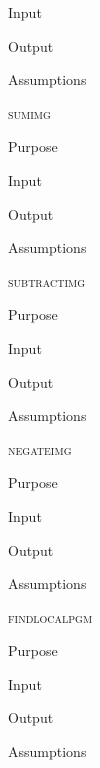 \documentclass[pdftex, 11pt]{article}
\begin{document}
\begin{description}
\begin{description}
			\item{Input}


			\item{Output}


			\item{Assumptions}


		\end{description}



	\item{\textsc{sumimg}}
		\begin{description}
			\item{Purpose}


			\item{Input}


			\item{Output}


			\item{Assumptions}


		\end{description}



	\item{\textsc{subtractimg}}
		\begin{description}
			\item{Purpose}


			\item{Input}


			\item{Output}


			\item{Assumptions}


		\end{description}



	\item{\textsc{negateimg}}
		\begin{description}
			\item{Purpose}


			\item{Input}


			\item{Output}


			\item{Assumptions}


		\end{description}



	\item{\textsc{findlocalpgm}}
		\begin{description}
			\item{Purpose}


			\item{Input}


			\item{Output}


			\item{Assumptions}


		\end{description}


\end{description}
\end{document}

